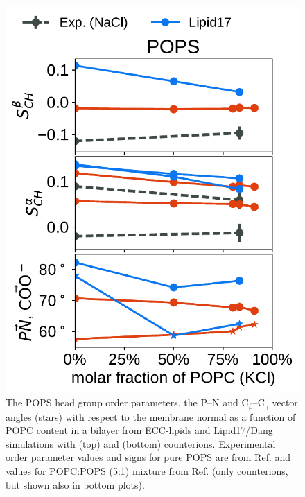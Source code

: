 \documentclass[journal=jpcbfk,manuscript=article]{achemso}
\newlength{\figheightsmall}
\newlength{\figheight}
\begin{document}
\begin{figure}[!tbp]
  \includegraphics[height=\figheightsmall]{../Fig/order_parameters_changes_A-B_PC-PS_mix_POPS_kcl.pdf} 
  \caption{\label{fig:delta_ordPar_NaCl_PC-PS_mix_PS} 
    The POPS head group order parameters, the P--N and C$_\beta$--C$_\gamma$ vector angles (stars)
    with respect to the membrane normal as a function of POPC content in a bilayer
    from ECC-lipids and Lipid17/Dang simulations with  (top) and  (bottom) counterions.
    Experimental order parameter values and signs for pure POPS are from Ref.  and values
    for POPC:POPS (5:1) mixture from Ref.  (only  counterions, but shown also in bottom plots).
  }
\end{figure} 
\end{document}
